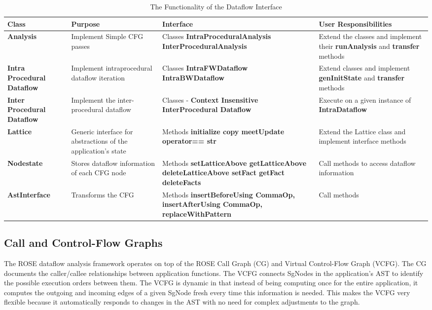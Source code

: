 \begin{table}
  \centering
  \scriptsize
  \begin{tabular}{ | p{2cm} | p{2cm} | p{3.5cm} | p{3.5cm} |}
    \hline
    Class & Purpose & Interface & User Responsibilities  \\ \hline
    {\bf Analysis} & Implement Simple CFG passes & Classes {\bf IntraProceduralAnalysis InterProceduralAnalysis} & Extend the classes and implement their {\bf runAnalysis} and {\bf transfer} methods \\ \hline
    {\bf Intra Procedural Dataflow} & Implement intraprocedural dataflow iteration & Classes {\bf IntraFWDataflow} {\bf IntraBWDataflow} & Extend classes and implement {\bf genInitState} and {\bf transfer} methods\\ \hline 
    {\bf Inter Procedural Dataflow} & Implement the inter-procedural dataflow & Classes - {\bf Context Insensitive InterProcedural Dataflow} & Execute on a given instance of {\bf IntraDataflow} \\ \hline
    {\bf Lattice} & Generic interface for abstractions of the application's state & Methods {\bf initialize copy meetUpdate operator== str} & Extend the Lattice class and implement interface methods \\ \hline 
    {\bf Nodestate} & Stores dataflow information of each CFG node & Methods {\bf setLatticeAbove getLatticeAbove deleteLatticeAbove setFact getFact deleteFacts} & Call methods to access dataflow information \\ \hline
    {\bf AstInterface} & Transforms the CFG & Methods {\bf insertBeforeUsing CommaOp, insertAfterUsing CommaOp, replaceWithPattern } & Call methods \\ 
  \hline
  \end{tabular}
  \caption{The Functionality of the Dataflow Interface}
\label{Func_DFA}
\end{table}


\subsection{Call and Control-Flow Graphs}
The ROSE dataflow analysis framework operates on top of the ROSE Call Graph (CG) and Virtual Control-Flow Graph (VCFG). The CG documents the caller/callee relationships between application functions. The VCFG connects SgNodes in the application’s AST to identify the possible execution orders between them. The VCFG is dynamic in that instead of being computing once for the entire application, it computes the outgoing and incoming edges of a given SgNode fresh every time this information is needed. This makes the VCFG very flexible because it automatically responds to changes in the AST with no need for complex adjustments to the graph. 

